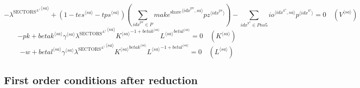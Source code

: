 \begin{equation}
-{\lambda^{\mathrm{SECTORS}^{\mathrm{A}^{\mathrm{1}}}}}^{\langle {s\!a}\rangle} + \left(1 - {{t\!e\!s}}^{\langle {s\!a}\rangle} - {{t\!p\!s}}^{\langle {s\!a}\rangle}\right) \left(\sum_{{i\!d\!x}^{\mathrm{pv}}\in P} {{{m\!a\!k\!e}^{\mathrm{share}}}^{\langle {i\!d\!x}^{\mathrm{pv}},{s\!a}\rangle}} {{{p\!z}}^{\langle {i\!d\!x}^{\mathrm{pv}}\rangle}}\right) - \sum_{{i\!d\!x}^{\mathrm{x}^{\mathrm{o}}}\in {P\!n\!o\!5}} {{{i\!o}}^{\langle {i\!d\!x}^{\mathrm{x}^{\mathrm{o}}},{s\!a}\rangle}} {{p}^{\langle {i\!d\!x}^{\mathrm{x}^{\mathrm{o}}}\rangle}} = 0
 \quad \left({V}^{\langle {s\!a}\rangle}\right)
\end{equation}
\begin{equation}
-{p\!k} + {{{b\!e\!t\!a\!k}}^{\langle {s\!a}\rangle}} {{\gamma}^{\langle {s\!a}\rangle}} {{\lambda^{\mathrm{SECTORS}^{\mathrm{A}^{\mathrm{1}}}}}^{\langle {s\!a}\rangle}} {{{K}^{\langle {s\!a}\rangle}}^{-1 + {{b\!e\!t\!a\!k}}^{\langle {s\!a}\rangle}}} {{{L}^{\langle {s\!a}\rangle}}^{{{b\!e\!t\!a\!l}}^{\langle {s\!a}\rangle}}} = 0
 \quad \left({K}^{\langle {s\!a}\rangle}\right)
\end{equation}
\begin{equation}
-w + {{{b\!e\!t\!a\!l}}^{\langle {s\!a}\rangle}} {{\gamma}^{\langle {s\!a}\rangle}} {{\lambda^{\mathrm{SECTORS}^{\mathrm{A}^{\mathrm{1}}}}}^{\langle {s\!a}\rangle}} {{{K}^{\langle {s\!a}\rangle}}^{{{b\!e\!t\!a\!k}}^{\langle {s\!a}\rangle}}} {{{L}^{\langle {s\!a}\rangle}}^{-1 + {{b\!e\!t\!a\!l}}^{\langle {s\!a}\rangle}}} = 0
 \quad \left({L}^{\langle {s\!a}\rangle}\right)
\end{equation}


\subsection{First order conditions after reduction}


